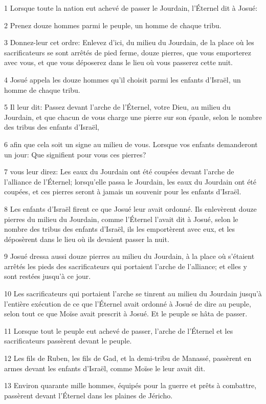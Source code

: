 \par 1 Lorsque toute la nation eut achevé de passer le Jourdain, l'Éternel dit à Josué:
\par 2 Prenez douze hommes parmi le peuple, un homme de chaque tribu.
\par 3 Donnez-leur cet ordre: Enlevez d'ici, du milieu du Jourdain, de la place où les sacrificateurs se sont arrêtés de pied ferme, douze pierres, que vous emporterez avec vous, et que vous déposerez dans le lieu où vous passerez cette nuit.
\par 4 Josué appela les douze hommes qu'il choisit parmi les enfants d'Israël, un homme de chaque tribu.
\par 5 Il leur dit: Passez devant l'arche de l'Éternel, votre Dieu, au milieu du Jourdain, et que chacun de vous charge une pierre sur son épaule, selon le nombre des tribus des enfants d'Israël,
\par 6 afin que cela soit un signe au milieu de vous. Lorsque vos enfants demanderont un jour: Que signifient pour vous ces pierres?
\par 7 vous leur direz: Les eaux du Jourdain ont été coupées devant l'arche de l'alliance de l'Éternel; lorsqu'elle passa le Jourdain, les eaux du Jourdain ont été coupées, et ces pierres seront à jamais un souvenir pour les enfants d'Israël.
\par 8 Les enfants d'Israël firent ce que Josué leur avait ordonné. Ils enlevèrent douze pierres du milieu du Jourdain, comme l'Éternel l'avait dit à Josué, selon le nombre des tribus des enfants d'Israël, ils les emportèrent avec eux, et les déposèrent dans le lieu où ils devaient passer la nuit.
\par 9 Josué dressa aussi douze pierres au milieu du Jourdain, à la place où s'étaient arrêtés les pieds des sacrificateurs qui portaient l'arche de l'alliance; et elles y sont restées jusqu'à ce jour.
\par 10 Les sacrificateurs qui portaient l'arche se tinrent au milieu du Jourdain jusqu'à l'entière exécution de ce que l'Éternel avait ordonné à Josué de dire au peuple, selon tout ce que Moïse avait prescrit à Josué. Et le peuple se hâta de passer.
\par 11 Lorsque tout le peuple eut achevé de passer, l'arche de l'Éternel et les sacrificateurs passèrent devant le peuple.
\par 12 Les fils de Ruben, les fils de Gad, et la demi-tribu de Manassé, passèrent en armes devant les enfants d'Israël, comme Moïse le leur avait dit.
\par 13 Environ quarante mille hommes, équipés pour la guerre et prêts à combattre, passèrent devant l'Éternel dans les plaines de Jéricho.
